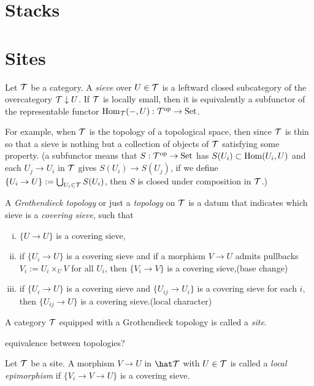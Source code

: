 \documentclass{../../large}
\begin{document}
\chapter{Stacks}



\chapter{Sites}

\begin{prb}
Let $\mathcal{T}$ be a category.
A \emph{sieve} over $U\in\mathcal{T}$ is a leftward closed subcategory of the overcategory $\mathcal{T}\downarrow U$.
If $\mathcal{T}$ is locally small, then it is equivalently a subfunctor of the representable functor $\operatorname{Hom}_{\mathcal{T}}(-,U):\mathcal{T}^{\mathrm{op}}\to\mathrm{Set}$.

For example, when $\mathcal{T}$ is the topology of a topological space, then since $\mathcal{T}$ is thin so that a sieve is nothing but a collection of objects of $\mathcal{T}$ satisfying some property.
(a subfunctor means that $S:\mathcal{T}^{\mathrm{op}}\to\mathrm{Set}$ has $S(U_i)\subset\operatorname{Hom}(U_i,U)$ and each $U_j\to U_i$ in $\mathcal{T}$ gives $S(U_i)\to S(U_j)$, if we define $\{U_i\to U\}:=\bigcup_{U_i\in\mathcal{T}}S(U_i)$, then $S$ is closed under composition in $\mathcal{T}$.)

A \emph{Grothendieck topology} or just a \emph{topology} on $\mathcal{T}$ is a datum that indicates which sieve is a \emph{covering sieve}, such that
\begin{enumerate}[(i)]
\item $\{U\to U\}$ is a covering sieve,
\item if $\{U_i\to U\}$ is a covering sieve and if a morphism $V\to U$ admits pullbacks $V_i:=U_i\times_UV$ for all $U_i$, then $\{V_i\to V\}$ is a covering sieve,\hfill(base change)
\item if $\{U_i\to U\}$ is a covering sieve and $\{U_{ij}\to U_i\}$ is a covering sieve for each $i$, then $\{U_{ij}\to U\}$ is a covering sieve.\hfill(local character)
\end{enumerate}

A category $\mathcal{T}$ equipped with a Grothendieck topology is called a \emph{site}.

equivalence between topologies?
\end{prb}

\begin{prb}
Let $\mathcal{T}$ be a site.
A morphism $V\to U$ in $\hat\cT$ with $U\in\mathcal{T}$ is called a \emph{local epimorphism} if $\{V_i\to V\to U\}$ is a covering sieve.

\end{prb}
\end{document}
